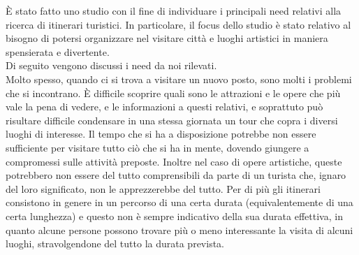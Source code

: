 È stato fatto uno studio con il fine di individuare i principali need relativi alla ricerca di itinerari turistici. In particolare, il focus dello studio è stato relativo al bisogno di potersi organizzare nel visitare città e luoghi artistici in maniera spensierata e divertente. \\ Di seguito vengono discussi i need da noi rilevati. \\

Molto spesso, quando ci si trova a visitare un nuovo posto, sono molti i problemi che si incontrano. È difficile scoprire quali sono le attrazioni e le opere che più vale la pena di vedere, e le informazioni a questi relativi, e soprattuto può risultare difficile condensare in una stessa giornata un tour che copra i diversi luoghi di interesse. Il tempo che si ha a disposizione potrebbe non essere sufficiente per visitare tutto ciò che si ha in mente, dovendo giungere a compromessi sulle attività preposte.
Inoltre nel caso di opere artistiche, queste potrebbero non essere del tutto comprensibili da parte di un turista che, ignaro del loro significato, non le apprezzerebbe del tutto. Per di più gli itinerari consistono in genere in un percorso di una certa durata (equivalentemente di una certa lunghezza) e questo non è sempre indicativo della sua durata effettiva, in quanto alcune persone possono trovare più o meno interessante la visita di alcuni luoghi, stravolgendone del tutto la durata prevista.